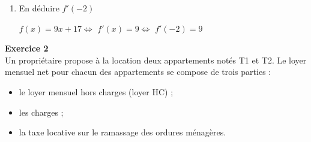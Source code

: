 \documentclass[12pt,a4paper]{article}
\theoremstyle{break}
\begin{document}
\begin{enumerate}
\begin{enumerate}
\begin{enumerate}
		\end{enumerate}
			\item En déduire $f'(-2)$\par
			$f(x) = 9x+17$$\Leftrightarrow$
			$f'(x) = 9$$\Leftrightarrow$
			$f'(-2) = 9$ 
			
		\end{enumerate}
\end{enumerate}


\begin{comment}
	\psset{xunit=1cm,yunit=0.3cm,algebraic=true}
\def\xmin {-3}
\def\xmax {13}
\def\ymin {-7}
\def\ymax {30}

	\begin{pspicture*}(\xmin,\ymin)(\xmax,\ymax)
	\psgrid[subgriddiv=2,gridlabels=3pt,gridwidth=0.5pt,griddots=10,subgriddots=10](\xmin,\ymin)(\xmax,\ymax)
	\psaxes[Dy=5]{->}(0,0)(\xmin,\ymin)(\xmax,\ymax)
		\psplot[linewidth=1pt]{-3}{3}{x^3-3*x+1}
		\psplot[linewidth=1pt]{-3}{3}{9*x+17}
		\psplot[linewidth=1pt]{-3}{3}{9}
		\psline[arrowscale=2,linestyle=dashed]{<->}(-1,4)(1,-2)
		\psline[arrowscale=2,linestyle=dashed]{<->}(-2.5,3)(0.5,3)
			\psline[arrowscale=2,linestyle=dashed]{<->}(1,-6)(3,12)
			\psdot[dotstyle=*](-1,3)
				\psdot[dotstyle=*](0,1)
					\psdot[dotstyle=*](2,3)
						\psdot[dotstyle=*](1,26)
						\psdot[dotstyle=*](-2,9)
	\end{pspicture*}

\end{comment}



\newpage
\textbf{Exercice 2}\\
	Un propriétaire propose à la location deux appartements notés T1 et T2. Le loyer mensuel net pour chacun des appartements se compose de trois parties :
	\begin{itemize}
		\item le loyer mensuel hors charges (loyer HC) ;
		\item les charges ;
		\item la taxe locative sur le ramassage des ordures ménagères.
	\end{itemize}
	
\end{document}
